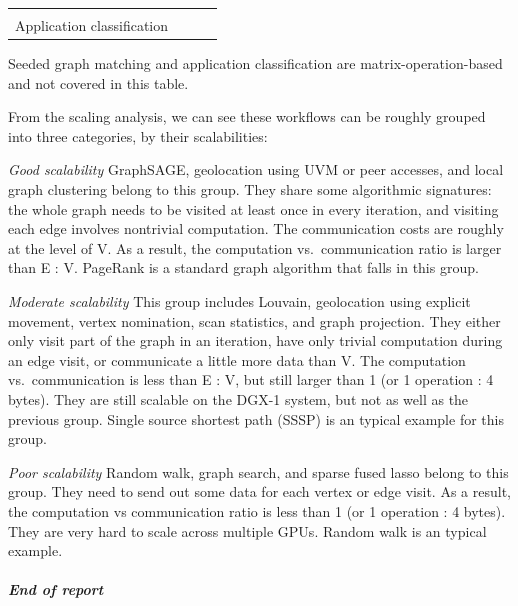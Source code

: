 \documentclass[10pt,oneside]{memoir}
\let\oldsubparagraph\subparagraph
\renewcommand{\subparagraph}[1]{\oldsubparagraph{#1}\mbox{}}
\begin{document}
\begin{longtable}[]{@{}llll@{}}
\begin{minipage}[t]{0.19\columnwidth}
\strut
\end{minipage}\tabularnewline
\begin{minipage}[t]{0.23\columnwidth}\raggedright
Application classification\strut
\end{minipage} & \begin{minipage}[t]{0.35\columnwidth}\raggedright
\strut
\end{minipage} & \begin{minipage}[t]{0.11\columnwidth}\raggedright
\strut
\end{minipage} & \begin{minipage}[t]{0.19\columnwidth}\raggedright
\strut
\end{minipage}\tabularnewline
\bottomrule
\end{longtable}

Seeded graph matching and application classification are
matrix-operation-based and not covered in this table.

From the scaling analysis, we can see these workflows can be roughly
grouped into three categories, by their scalabilities:

\emph{Good scalability} GraphSAGE, geolocation using UVM or peer
accesses, and local graph clustering belong to this group. They share
some algorithmic signatures: the whole graph needs to be visited at
least once in every iteration, and visiting each edge involves
nontrivial computation. The communication costs are roughly at the level
of V. As a result, the computation vs.~communication ratio is larger
than E : V. PageRank is a standard graph algorithm that falls in this
group.

\emph{Moderate scalability} This group includes Louvain, geolocation
using explicit movement, vertex nomination, scan statistics, and graph
projection. They either only visit part of the graph in an iteration,
have only trivial computation during an edge visit, or communicate a
little more data than V. The computation vs.~communication is less than
E : V, but still larger than 1 (or 1 operation : 4 bytes). They are
still scalable on the DGX-1 system, but not as well as the previous
group. Single source shortest path (SSSP) is an typical example for this
group.

\emph{Poor scalability} Random walk, graph search, and sparse fused
lasso belong to this group. They need to send out some data for each
vertex or edge visit. As a result, the computation vs communication
ratio is less than 1 (or 1 operation : 4 bytes). They are very hard to
scale across multiple GPUs. Random walk is an typical example.

\hypertarget{end-of-report}{%
\subparagraph{End of report}\label{end-of-report}}
\end{document}
